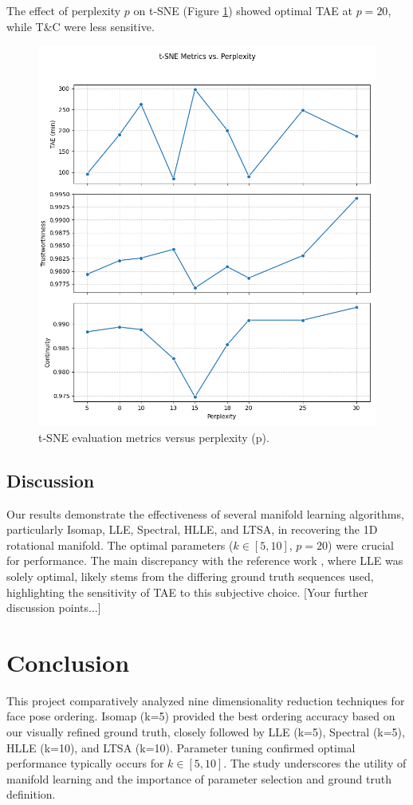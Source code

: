 \documentclass{article}
\begin{document}
The effect of perplexity $p$ on t-SNE (Figure \ref{fig:tuning_p}) showed optimal TAE at $p=20$, while T\&C were less sensitive.

\begin{figure}[htbp]
  \centering
  \includegraphics[width=0.7\linewidth]{../figs/tuning_p.png}
  \caption{t-SNE evaluation metrics versus perplexity (p).}
  \label{fig:tuning_p}
\end{figure}

\subsection{Discussion}
Our results demonstrate the effectiveness of several manifold learning algorithms, particularly Isomap, LLE, Spectral, HLLE, and LTSA, in recovering the 1D rotational manifold. The optimal parameters ($k \in [5, 10]$, $p=20$) were crucial for performance. The main discrepancy with the reference work \citep{CSIC5011_RefReport}, where LLE was solely optimal, likely stems from the differing ground truth sequences used, highlighting the sensitivity of TAE to this subjective choice. [Your further discussion points...]

\section{Conclusion}
\label{sec:conclusion}
This project comparatively analyzed nine dimensionality reduction techniques for face pose ordering. Isomap (k=5) provided the best ordering accuracy based on our visually refined ground truth, closely followed by LLE (k=5), Spectral (k=5), HLLE (k=10), and LTSA (k=10). Parameter tuning confirmed optimal performance typically occurs for $k \in [5, 10]$. The study underscores the utility of manifold learning and the importance of parameter selection and ground truth definition.
\end{document}
